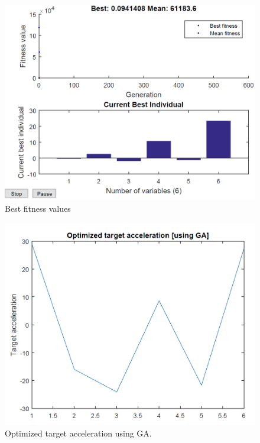 \begin{figure}[H]
	\centering
	\includegraphics[scale = 0.4]{fig/GApolyF.PNG}
	\caption{Best fitness values}
	\label{GA poly F}
\end{figure}

\begin{figure}[H]
	\centering
	\includegraphics[scale = 0.4]{fig/GApolyXNT.PNG}
	\caption{Optimized target acceleration using GA.}
	\label{GA poly XNT}
\end{figure}


